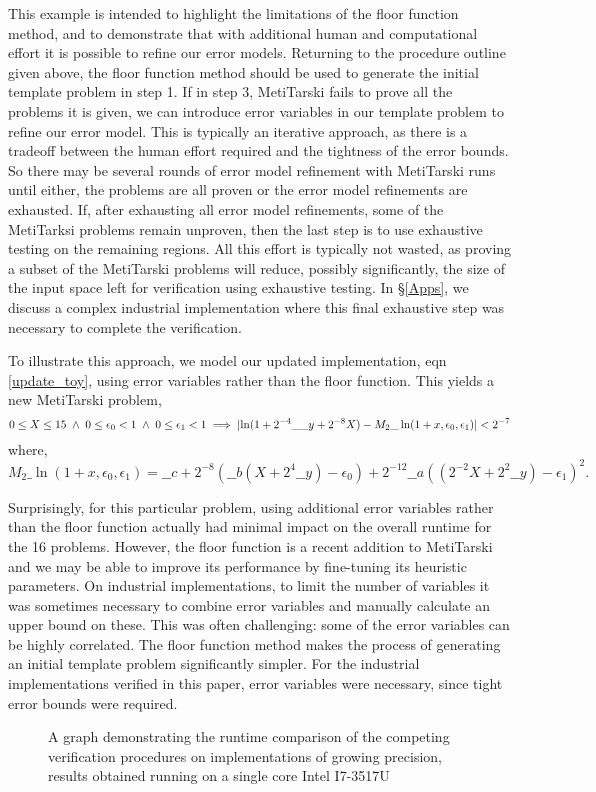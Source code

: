 \documentclass{fac}
\newcommand{\abs}[1]{\lvert#1\rvert}
\begin{document}
This example is intended to highlight the limitations of the floor function method, and to demonstrate that with additional human and computational effort it is possible to refine our error models. Returning to the procedure outline given above, the floor function method should be used to generate the initial template problem in step 1. If in step 3, MetiTarski fails to prove all the problems it is given, we can introduce error variables in our template problem to refine our error model. This is typically an iterative approach, as there is a tradeoff between the human effort required and the tightness of the error bounds. So there may be several rounds of error model refinement with MetiTarski runs until either, the problems are all proven or the error model refinements are exhausted. If, after exhausting all error model refinements, some of the MetiTarksi problems remain unproven, then the last step is to use exhaustive testing on the remaining regions. All this effort is typically not wasted, as proving a subset of the MetiTarski problems will reduce, possibly significantly, the size of the input space left for verification using exhaustive testing. In \S \ref{Apps}, we discuss a complex industrial implementation where this final exhaustive step was necessary to complete the verification.

To illustrate this approach, we model our updated implementation, eqn \ref{update_toy}, using error variables rather than the floor function. This yields a new MetiTarski problem,
\[
	0\le X \le 15 \hspace{0.1cm} \land \hspace{0.1cm} 0\le \epsilon_0<1\hspace{0.1cm} \land \hspace{0.1cm} 0\le \epsilon_1<1
	\implies \abs{\ln(1+2^{-4}\_\_y+2^{-8}X) - M_2\_\ln(1+x,\epsilon_0,\epsilon_1)} < 2^{-7}
\]
where, 
\[
M_2\_\ln(1+x,\epsilon_0,\epsilon_1)=\_\_c+2^{-8}(\_\_b(X+2^{4}\_\_y)-\epsilon_0)+2^{-12}\_\_a((2^{-2}X+2^{2}\_\_y)-\epsilon_1)^2.
\]

Surprisingly, for this particular problem, using additional error variables rather than the floor function actually had minimal impact on the overall runtime for the 16 problems. However, the floor function is a recent addition to MetiTarski and we may be able to improve its performance by fine-tuning its heuristic parameters. On industrial implementations, to limit the number of variables it was sometimes necessary to combine error variables and manually calculate an upper bound on these. This was often challenging: some of the error variables can be highly correlated. The floor function method makes the process of generating an initial template problem significantly simpler. For the industrial implementations verified in this paper, error variables were necessary, since tight error bounds were required.
\begin{figure}
\centering
\scalebox{0.9}{}
\caption{A graph demonstrating the runtime comparison of the competing verification procedures on implementations of growing precision, results obtained running on a single core Intel I7-3517U \label{runtime_graph}}
\end{figure}
\end{document}
